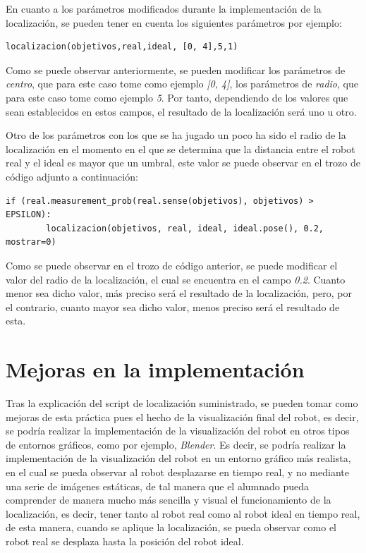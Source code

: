 \documentclass[11pt]{report}
\begin{document}
En cuanto a los parámetros modificados durante la implementación de la localización, se pueden tener en cuenta los siguientes parámetros por ejemplo:

\begin{lstlisting}[style=python, caption={Ejecución de la primera operación de Localización}, label=python-script-first-operation]
    localizacion(objetivos,real,ideal, [0, 4],5,1)
\end{lstlisting}

Como se puede observar anteriormente, se pueden modificar los parámetros de \emph{centro}, que para este caso tome como ejemplo \emph{[0, 4]}, los parámetros de \emph{radio}, que para este caso tome como ejemplo \emph{5}. Por tanto, dependiendo de los valores que sean establecidos en estos campos, el resultado de la localización será uno u otro.

Otro de los parámetros con los que se ha jugado un poco ha sido el radio de la localización en el momento en el que se determina que la distancia entre el robot real y el ideal es mayor que un umbral, este valor se puede observar en el trozo de código adjunto a continuación:

\begin{lstlisting}[style=python, caption={Localización del robot}, label=python-robot-localization]
    if (real.measurement_prob(real.sense(objetivos), objetivos) > EPSILON):
        localizacion(objetivos, real, ideal, ideal.pose(), 0.2, mostrar=0)
\end{lstlisting}

Como se puede observar en el trozo de código anterior, se puede modificar el valor del radio de la localización, el cual se encuentra en el campo \emph{0.2}. Cuanto menor sea dicho valor, más preciso será el resultado de la localización, pero, por el contrario, cuanto mayor sea dicho valor, menos preciso será el resultado de esta.

\section{Mejoras en la implementación}

Tras la explicación del script de localización suministrado, se pueden tomar como mejoras de esta práctica pues el hecho de la visualización final del robot, es decir, se podría realizar la implementación de la visualización del robot en otros tipos de entornos gráficos, como por ejemplo, \emph{Blender}. Es decir, se podría realizar la implementación de la visualización del robot en un entorno gráfico más realista, en el cual se pueda observar al robot desplazarse en tiempo real, y no mediante una serie de imágenes estáticas, de tal manera que el alumnado pueda comprender de manera mucho más sencilla y visual el funcionamiento de la localización, es decir, tener tanto al robot real como al robot ideal en tiempo real, de esta manera, cuando se aplique la localización, se pueda observar como el robot real se desplaza hasta la posición del robot ideal.
\end{document}
